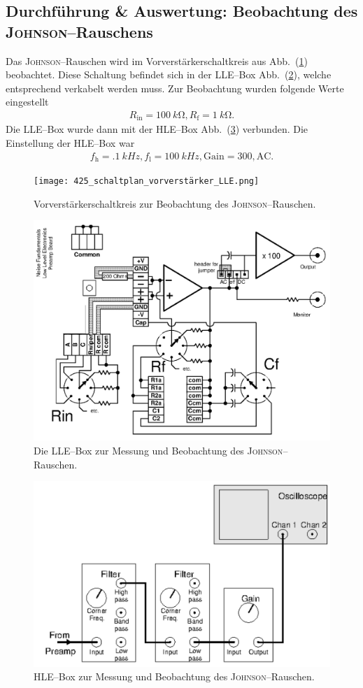 \documentclass[sn-mathphys-num,iicol]{sn-jnl}
\theoremstyle{thmstyleone}
\theoremstyle{thmstyletwo}
\theoremstyle{thmstylethree}
\begin{document}
\subsection{Durchführung \& Auswertung: Beobachtung des \textsc{Johnson}--Rauschens}
Das \textsc{Johnson}--Rauschen wird im Vorverstärkerschaltkreis aus Abb.\ (\ref{fig:vorverstärker}) beobachtet.
Diese Schaltung befindet sich in der LLE--Box Abb.\ (\ref{fig:johnson_lle}), welche entsprechend verkabelt werden muss.
Zur Beobachtung wurden folgende Werte eingestellt
\begin{align} 
        R_\text{in}=\SI{100}{k\ohm},R_\text{f}=\SI{1}{k\ohm}
.\end{align} 
Die LLE--Box wurde dann mit der HLE--Box Abb.\ (\ref{fig:johnson_hle}) verbunden.
Die Einstellung der HLE--Box war
\begin{align} 
        f_\text{h}=\SI{.1}{kHz},f_\text{l}=\SI{100}{kHz},\text{Gain}=300,\text{AC}
.\end{align} 

\begin{figure}[t]
        \centering
        \texttt{[image: 425\_schaltplan\_vorverstärker\_LLE.png]}
        \caption{Vorverstärkerschaltkreis zur Beobachtung des \textsc{Johnson}--Rauschen.\cite{anleitung425}} \label{fig:vorverstärker}
\end{figure}

\begin{figure}[t]
        \centering
        \includegraphics[width=.5\textwidth]{425_schaltplan_johnson_LLE.png}
        \caption{Die LLE--Box zur Messung und Beobachtung des \textsc{Johnson}--Rauschen.\cite{anleitung425}} \label{fig:johnson_lle}
\end{figure}

\begin{figure}[t]
        \centering
        \includegraphics[width=.5\textwidth]{425_schaltplan_visualisierung_johnson_HLE.png}
        \caption{HLE--Box zur Messung und Beobachtung des \textsc{Johnson}--Rauschen.\cite{anleitung425}} \label{fig:johnson_hle}
\end{figure}
\end{document}
